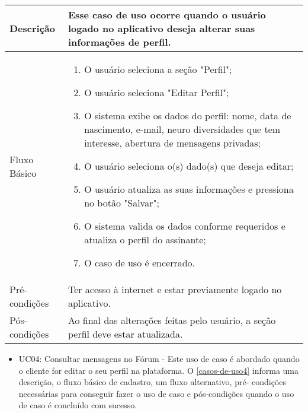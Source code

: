 \begin{apendicesenv}
\begin{longtable}{|p{3.3cm}|p{12.3cm}|}
		Descrição & Esse caso de uso ocorre quando o usuário logado no aplicativo deseja alterar suas informações de perfil.\\
		\hline
		Fluxo Básico  &
		\begin{enumerate}
			\item O usuário seleciona a seção "Perfil";
			\item O usuário seleciona "Editar Perfil";
			\item O sistema exibe os dados do perfil: nome, data de nascimento, e-mail, neuro diversidades que tem interesse, abertura de mensagens privadas;
			\item O usuário seleciona o(s) dado(s) que deseja editar;
			\item O usuário atualiza as suas informações e pressiona no botão "Salvar";
			\item O sistema valida os dados conforme requeridos e atualiza o perfil do assinante;
			\item O caso de uso é encerrado. 
		\end{enumerate}\\
		\hline
		Pré-condições & Ter acesso à internet e estar previamente logado no aplicativo.\\
		\hline
		Pós-condições & Ao final das alterações feitas pelo usuário, a seção perfil deve estar atualizada.\\
		\hline
	\end{longtable}
	
	
	\begin{itemize}
		\item UC04: Consultar mensagens no Fórum - Este uso de caso é abordado quando o cliente for editar o seu perfil na plataforma.
		O \autoref{casos-de-uso4} informa uma descrição, o fluxo básico de cadastro, um fluxo alternativo, pré-
		condições necessárias para conseguir fazer o uso de caso e pós-condições quando o uso de
		caso é concluído com sucesso. \\
		
	\end{itemize}
	
	\begin{quadro}[htb]
		\centering
		\ABNTEXfontereduzida
		\caption[Caso de Uso Consultar mensagens do Fórum]{Caso de Uso Consultar mensagens do Fórum}
		\label{casos-de-uso4}
	\end{quadro}
	\begin{longtable}{|p{3.3cm}|p{12.3cm}|}
		\hline
		\thead{} & \thead{Ator} \\
		\hline
				

\end{longtable}
\end{apendicesenv}
